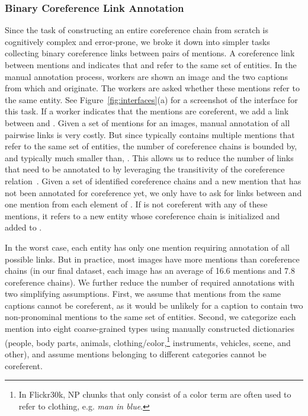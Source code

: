 \documentclass[twocolumn]{svjour3}
\begin{document}
\subsubsection{Binary Coreference Link Annotation}
Since the task of constructing an entire coreference chain from scratch is cognitively complex and error-prone, we broke it down into simpler tasks collecting binary coreference links between pairs of mentions. A coreference link between mentions  and  indicates that  and  refer to the same set of entities. In the manual annotation process, workers are shown an image and the two captions from which  and  originate. The workers are asked whether these mentions refer to the same entity.  See Figure~\ref{fig:interfaces}(a) for a screenshot of the interface for this task. If a worker indicates that the mentions are coreferent, we add a link between  and . Given a set of mentions  for an images, manual annotation of all  pairwise links is very costly. But since  typically contains multiple mentions that refer to the same set of entities, the number of coreference chains is bounded by, and typically much smaller than, . This allows us to reduce the number of links that need to be annotated to  by leveraging the transitivity of the coreference relation~\citep{mccarthy1995using}. Given a set of identified coreference chains  and a new mention  that has not been annotated for coreference yet, we only have to ask for links between  and one mention from each element of . If  is not coreferent with any of these mentions, it refers to a new entity whose coreference chain is initialized and added to .

In the worst case, each entity has only one mention requiring annotation of all  possible links. But in practice, most images have more mentions than coreference chains (in our final dataset, each image has an average of 16.6 mentions and 7.8 coreference chains). We further reduce the number of required annotations with two simplifying assumptions.  First, we assume that mentions from the same captions cannot be coreferent, as it would be unlikely for a caption to contain two non-pronominal mentions to the same set of entities. Second, we categorize each mention into eight coarse-grained types using manually constructed dictionaries (people, body parts, animals, clothing/color,\footnote{In Flickr30k, NP chunks that only consist of a color term are often used to refer to clothing, e.g.  \textit{man in blue}.} instruments, vehicles, scene,  and other), and assume mentions belonging to different categories cannot be coreferent. 
\end{document}
